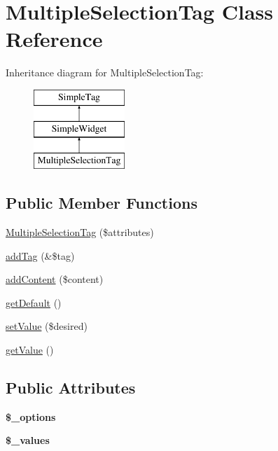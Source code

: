 \hypertarget{class_multiple_selection_tag}{
\section{MultipleSelectionTag Class Reference}
\label{class_multiple_selection_tag}
}
Inheritance diagram for MultipleSelectionTag:\begin{figure}[H]
\begin{center}
\leavevmode
\includegraphics[height=3.000000cm]{class_multiple_selection_tag}
\end{center}
\end{figure}
\subsection*{Public Member Functions}
\begin{DoxyCompactItemize}
\item 
\hyperlink{class_multiple_selection_tag_ad6478ee354b87d1f8a4824e191d9f8ec}{MultipleSelectionTag} (\$attributes)
\item 
\hyperlink{class_multiple_selection_tag_a3dff5d342339cf7f4d07acc3826e807f}{addTag} (\&\$tag)
\item 
\hyperlink{class_multiple_selection_tag_a189718260cdafedf3038e7aa9cdcf381}{addContent} (\$content)
\item 
\hyperlink{class_multiple_selection_tag_a3fa45878dee4cde402bc5a36dc3b3a80}{getDefault} ()
\item 
\hyperlink{class_multiple_selection_tag_a856ea3732ddfc727b1196ac769d5e487}{setValue} (\$desired)
\item 
\hyperlink{class_multiple_selection_tag_a4a3e75f773c42108d27fdc5c73cb0d55}{getValue} ()
\end{DoxyCompactItemize}
\subsection*{Public Attributes}
\begin{DoxyCompactItemize}
\item 
\hypertarget{class_multiple_selection_tag_af3bd56e0da0f32d95d4074781dc8dc05}{
{\bfseries \$\_\-options}}
\label{class_multiple_selection_tag_af3bd56e0da0f32d95d4074781dc8dc05}

\item 
\hypertarget{class_multiple_selection_tag_aa862a61abd15746b425344e66277169f}{
{\bfseries \$\_\-values}}
\label{class_multiple_selection_tag_aa862a61abd15746b425344e66277169f}

\end{DoxyCompactItemize}


